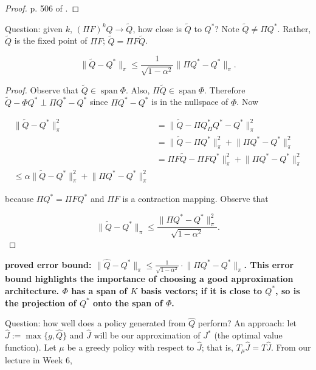 \begin{proof}
p. 506 of \citet{v2_bertsekas2012dynamic}.
\end{proof}

Question: given \(k\), \((\Pi F)^kQ \to \tilde{Q}\), how close is \(\tilde{Q}\) to \(Q^*\)? Note \(\tilde{Q} \neq \Pi Q^*\). Rather, \(\tilde{Q}\) is the fixed point of \(\Pi F\); \(\tilde{Q} = \Pi F \tilde{Q}\). 

\begin{theorem}

\[
\lVert \tilde{Q} - Q^* \rVert_\pi \leq \frac{1}{\sqrt{1 - \alpha ^2}} \lVert \Pi Q^* - Q^* \rVert_\pi.
\]

\end{theorem}

\begin{proof}

Observe that \(\tilde{Q} \in \operatorname{span} \Phi\). Also, \( \Pi \tilde{Q} \in \operatorname{span} \Phi\). Therefore \(\tilde{Q} - \Phi Q^* \perp \Pi Q^* - Q^*\) since \(\Pi Q^* - Q^*\) is in the nullspace of \(\Phi\). Now

\begin{align*}
\lVert \tilde{Q} - Q^* \rVert_\pi^2 & = \lVert \tilde{Q} - \Pi Q^* _ \Pi Q^* - Q^* \rVert_\pi^2 
\\ & = \lVert \tilde{Q} - \Pi Q^* \rVert_\pi^2 + \lVert \Pi Q^* - Q^* \rVert_\pi^2
\\ & = \Pi F \tilde{Q} - \Pi F Q^* \rVert_\pi^2 + \lVert \Pi Q^* - Q^* \rVert_\pi^2
\\ \leq \alpha \lVert \tilde{Q} - Q^* \rVert_\pi^2 + \lVert \Pi Q^* - Q^* \rVert_\pi^2 
\end{align*}

because \(\Pi Q^* = \Pi FQ^*\) and \(\Pi F\) is a contraction mapping. Observe that

\[
\lVert \tilde{Q} - Q^* \rVert_\pi \leq \frac{\lVert \Pi Q^* - Q^* \rVert_\pi^2}{\sqrt{1 - \alpha^2}}.
\]

\end{proof}

\textbf{proved error bound: \(\lVert \hat{Q} - Q^* \rVert_\pi \leq \frac{1}{\sqrt{1 - \alpha^2}} \cdot \lVert \Pi Q^* - Q^* \rVert_\pi\). This error bound highlights the importance of choosing a good approximation architecture. \(\Phi\) has a span of \(K\) basis vectors; if it is close to \(Q^*\), so is the projection of \(Q^*\) onto the span of \(\Phi\).}

Question: how well does a policy generated from \(\hat{Q}\) perform? An approach: let \(\hat{J} := \max\{g, \hat{Q}\}\) and \(\hat{J}\) will be our approximation of \(J^*\) (the optimal value function). Let \(\mu\) be a greedy policy with respect to \(\hat{J}\); that is, \(T_\mu \hat{J} = T \hat{J}\). From our lecture in Week 6,

